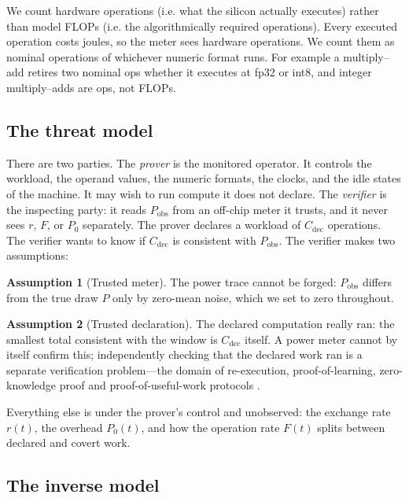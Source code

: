 \documentclass{article}
\theoremstyle{plain}
\theoremstyle{definition}
\newtheorem{assumption}[assumption]{Assumption}
\theoremstyle{remark}
\begin{document}
We count
hardware operations (i.e. what the silicon actually executes) rather than
model FLOPs (i.e. the algorithmically required operations).  Every executed operation costs joules, so
the meter sees hardware operations. We count them as
nominal operations of whichever numeric format runs. For example a multiply--add
retires two nominal ops whether it executes at fp32 or int8, and integer
multiply--adds are ops, not FLOPs. 

\subsection{The threat model}
\label{subsec:threat}

There are two parties. The \emph{prover} is the monitored operator. It controls the
workload, the operand values, the numeric formats, the clocks, and the idle
states of the machine. It may wish to run compute it does not declare.
The \emph{verifier} is the inspecting party: it reads $P_{\mathrm{obs}}$ from
an off-chip meter it trusts, and it never sees $r$, $F$, or $P_0$ separately.
The prover declares a workload of $C_{\mathrm{dec}}$ operations. The verifier wants to know if  $C_{\mathrm{dec}}$ is consistent with $P_{\mathrm{obs}}$. The verifier makes two assumptions:
\begin{assumption}[Trusted meter]
\label{ass:meter}
The power trace cannot be forged: $P_{\mathrm{obs}}$ differs from the true
draw $P$ only by zero-mean noise, which we set to zero throughout.
\end{assumption}

\begin{assumption}[Trusted declaration]
\label{ass:declaration}
The declared computation really ran: the smallest total consistent with the
window is $C_{\mathrm{dec}}$ itself. A power meter cannot by itself confirm
this; independently checking that the declared work ran is a separate
verification problem---the domain of re-execution, proof-of-learning,
zero-knowledge proof and proof-of-useful-work protocols
\citep{jia2021proofoflearning,garg2023zkpot,sun2024zkllm,pearl2026pouw}.
\end{assumption}
Everything else is under the prover's control and unobserved: the exchange
rate $r(t)$, the overhead $P_0(t)$, and how the operation rate $F(t)$ splits
between declared and covert work.

\subsection{The inverse model}
\label{subsec:noninjective}
\end{document}
